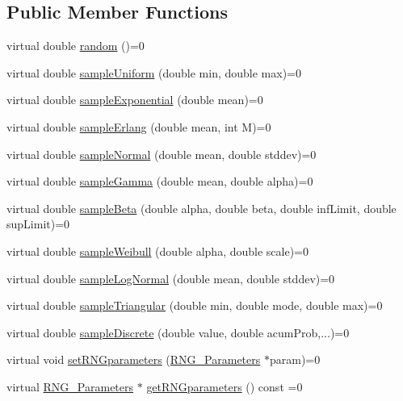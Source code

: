 \subsection*{Public Member Functions}
\begin{DoxyCompactItemize}
\item 
virtual double \hyperlink{class_sampler__if_a8136ccd467ee5621813269fa23791423}{random} ()=0
\item 
virtual double \hyperlink{class_sampler__if_a0643f4ca1d770d01afefa956e9f78edf}{sample\+Uniform} (double min, double max)=0
\item 
virtual double \hyperlink{class_sampler__if_aeb17b9d84bc05c14f0be2ce0b60ed263}{sample\+Exponential} (double mean)=0
\item 
virtual double \hyperlink{class_sampler__if_acd16e61c373f5e051c5f4103848e5c8a}{sample\+Erlang} (double mean, int M)=0
\item 
virtual double \hyperlink{class_sampler__if_a559f1f29b5e4455c9e59cf00d622da47}{sample\+Normal} (double mean, double stddev)=0
\item 
virtual double \hyperlink{class_sampler__if_aafcceb6ad73790ddca45af1ea7f2088d}{sample\+Gamma} (double mean, double alpha)=0
\item 
virtual double \hyperlink{class_sampler__if_a1081daf677b12de42f0abfcbe5ba9301}{sample\+Beta} (double alpha, double beta, double inf\+Limit, double sup\+Limit)=0
\item 
virtual double \hyperlink{class_sampler__if_ac02b82a18e78c4bbaea1bc90c617857b}{sample\+Weibull} (double alpha, double scale)=0
\item 
virtual double \hyperlink{class_sampler__if_a031e1170c529e2cc67131d4da6ee683e}{sample\+Log\+Normal} (double mean, double stddev)=0
\item 
virtual double \hyperlink{class_sampler__if_a02d68c26089c6dd53b99882da79c88ca}{sample\+Triangular} (double min, double mode, double max)=0
\item 
virtual double \hyperlink{class_sampler__if_a2fcdf79225b5cdd023db7751655f1ceb}{sample\+Discrete} (double value, double acum\+Prob,...)=0
\item 
virtual void \hyperlink{class_sampler__if_a630a0cbbef6e49869063530b03d3bb35}{set\+R\+N\+Gparameters} (\hyperlink{class_sampler__if_1_1_r_n_g___parameters}{R\+N\+G\+\_\+\+Parameters} $\ast$param)=0
\item 
virtual \hyperlink{class_sampler__if_1_1_r_n_g___parameters}{R\+N\+G\+\_\+\+Parameters} $\ast$ \hyperlink{class_sampler__if_adb21edf9170ad5d9b27f4788db74bafa}{get\+R\+N\+Gparameters} () const =0
\end{DoxyCompactItemize}


